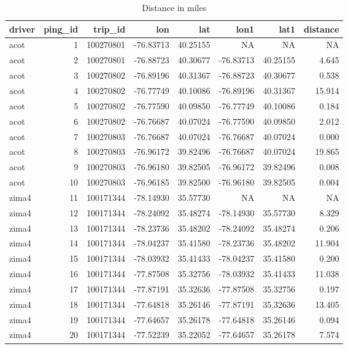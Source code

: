 \documentclass[]{article}
\begin{document}
\begin{table}[!h]

\caption{\label{tab:unnamed-chunk-4}Distance in miles}
\centering
\begin{tabular}{lrrrrrrr}
\toprule
driver & ping\_id & trip\_id & lon & lat & lon1 & lat1 & distance\\
\midrule
acot & 1 & 100270801 & -76.83713 & 40.25155 & NA & NA & NA\\
acot & 2 & 100270801 & -76.88723 & 40.30677 & -76.83713 & 40.25155 & 4.645\\
acot & 3 & 100270802 & -76.89196 & 40.31367 & -76.88723 & 40.30677 & 0.538\\
acot & 4 & 100270802 & -76.77749 & 40.10086 & -76.89196 & 40.31367 & 15.914\\
acot & 5 & 100270802 & -76.77590 & 40.09850 & -76.77749 & 40.10086 & 0.184\\
\addlinespace
acot & 6 & 100270802 & -76.76687 & 40.07024 & -76.77590 & 40.09850 & 2.012\\
acot & 7 & 100270803 & -76.76687 & 40.07024 & -76.76687 & 40.07024 & 0.000\\
acot & 8 & 100270803 & -76.96172 & 39.82496 & -76.76687 & 40.07024 & 19.865\\
acot & 9 & 100270803 & -76.96180 & 39.82505 & -76.96172 & 39.82496 & 0.008\\
acot & 10 & 100270803 & -76.96185 & 39.82500 & -76.96180 & 39.82505 & 0.004\\
\addlinespace
zima4 & 11 & 100171344 & -78.14930 & 35.57730 & NA & NA & NA\\
zima4 & 12 & 100171344 & -78.24092 & 35.48274 & -78.14930 & 35.57730 & 8.329\\
zima4 & 13 & 100171344 & -78.23736 & 35.48202 & -78.24092 & 35.48274 & 0.206\\
zima4 & 14 & 100171344 & -78.04237 & 35.41580 & -78.23736 & 35.48202 & 11.904\\
zima4 & 15 & 100171344 & -78.03932 & 35.41433 & -78.04237 & 35.41580 & 0.200\\
\addlinespace
zima4 & 16 & 100171344 & -77.87508 & 35.32756 & -78.03932 & 35.41433 & 11.038\\
zima4 & 17 & 100171344 & -77.87191 & 35.32636 & -77.87508 & 35.32756 & 0.197\\
zima4 & 18 & 100171344 & -77.64818 & 35.26146 & -77.87191 & 35.32636 & 13.405\\
zima4 & 19 & 100171344 & -77.64657 & 35.26178 & -77.64818 & 35.26146 & 0.094\\
zima4 & 20 & 100171344 & -77.52239 & 35.22052 & -77.64657 & 35.26178 & 7.574\\
\bottomrule
\end{tabular}
\end{table}
\end{document}
